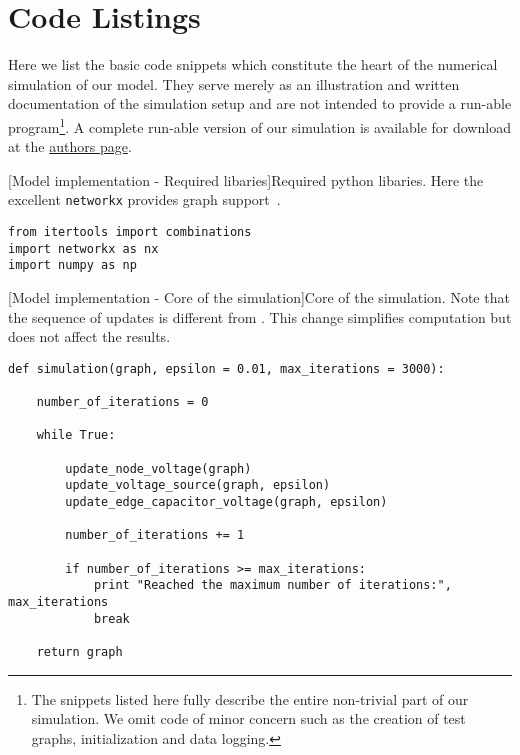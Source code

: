 
\chapter{Code Listings}\label{app:code}

	Here we list the basic code snippets which constitute the heart of the numerical simulation of our model. They serve merely as an illustration and written documentation of the simulation setup and are not intended to provide a run-able program\footnote{The snippets listed here fully describe the entire non-trivial part of our simulation. We omit code of minor concern such as the creation of test graphs, initialization and data logging.}. A complete run-able version of our simulation is available for download at the \href{https://people.mpi-inf.mpg.de/~mtd/}{authors page}.

\begin{codesnippet}

[Model implementation - Required libaries]{Required python libaries.  Here the excellent \texttt{networkx} provides graph support~\cite{networkx}.}
\label{code:libaries}

\begin{verbatim}
from itertools import combinations
import networkx as nx
import numpy as np
\end{verbatim}

\end{codesnippet}


\begin{codesnippet}
[Model implementation - Core of the simulation]{Core of the simulation. Note that the sequence of updates is different from . This change simplifies computation but does not affect the results.}
\label{code:simulation}
\begin{verbatim}
def simulation(graph, epsilon = 0.01, max_iterations = 3000):

	number_of_iterations = 0

	while True:
		
		update_node_voltage(graph)
		update_voltage_source(graph, epsilon)
		update_edge_capacitor_voltage(graph, epsilon)
		
		number_of_iterations += 1	

		if number_of_iterations >= max_iterations:
			print "Reached the maximum number of iterations:", max_iterations
			break

	return graph
\end{verbatim}

\end{codesnippet}


